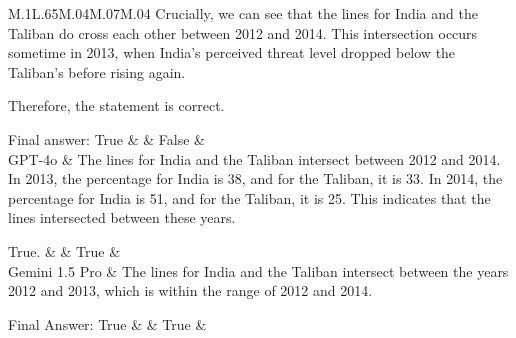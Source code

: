 \begin{table*}[t]
\begin{tabular}{M{.1\linewidth}L{.65\linewidth}M{.04\linewidth}M{.07\linewidth}M{.04\linewidth}}
Crucially, we can see that the lines for India and the Taliban do cross each other between 2012 and 2014. This intersection occurs sometime in 2013, when India's perceived threat level dropped below the Taliban's before rising again.

Therefore, the statement is correct.

Final answer: True & \xmark & False & \cmark \\
\midrule
GPT-4o & The lines for India and the Taliban intersect between 2012 and 2014. In 2013, the percentage for India is 38, and for the Taliban, it is 33. In 2014, the percentage for India is 51, and for the Taliban, it is 25. This indicates that the lines intersected between these years.

True. & \xmark & True & \xmark \\
\midrule
Gemini 1.5 Pro & The lines for India and the Taliban intersect between the years 2012 and 2013, which is within the range of 2012 and 2014. 

Final Answer: True & \xmark & True & \xmark \\
\bottomrule
    \end{tabular}
    \caption{Examples of dataset and model responses for \texttt{Charts-Intersection} (2)} \label{tab:examples_Charts-Intersection_2}%
\end{table*}
%
%
%
\clearpage
%
%
%

